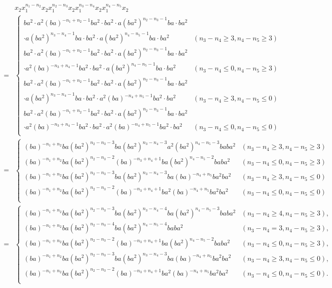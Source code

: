 \documentclass{amsart}
\theoremstyle{plain}
\theoremstyle{definition}
\begin{document}
{\allowdisplaybreaks
\begin{align*}
& x_2x_1^{n_1-n_2}x_2x_1^{n_2-n_3}x_2x_1^{n_3-n_4}x_2x_1^{n_4-n_5}x_2 \\
= & \begin{cases}
ba^2\cdot a^2(ba)^{-n_1+n_2-1}ba^2\cdot ba^2\cdot a(ba^2)^{n_2-n_3-1}ba\cdot ba^2 \\
\cdot a(ba^2)^{n_3-n_4-1}ba\cdot ba^2\cdot a(ba^2)^{n_4-n_5-1}ba\cdot ba^2 & (n_3-n_4\geq 3, n_4-n_5\geq 3) \\
ba^2\cdot a^2(ba)^{-n_1+n_2-1}ba^2\cdot ba^2\cdot a(ba^2)^{n_2-n_3-1}ba\cdot ba^2 \\
\cdot a^2(ba)^{-n_3+n_4-1}ba^2\cdot ba^2\cdot a(ba^2)^{n_4-n_5-1}ba\cdot ba^2 & (n_3-n_4\leq 0, n_4-n_5\geq 3) \\
ba^2\cdot a^2(ba)^{-n_1+n_2-1}ba^2\cdot ba^2\cdot a(ba^2)^{n_2-n_3-1}ba\cdot ba^2 \\
\cdot a(ba^2)^{n_3-n_4-1}ba\cdot ba^2\cdot a^2(ba)^{-n_4+n_5-1}ba^2\cdot ba^2 & (n_3-n_4\geq 3, n_4-n_5\leq 0) \\
ba^2\cdot a^2(ba)^{-n_1+n_2-1}ba^2\cdot ba^2\cdot a(ba^2)^{n_2-n_3-1}ba\cdot ba^2 \\
\cdot a^2(ba)^{-n_3+n_4-1}ba^2\cdot ba^2\cdot a^2(ba)^{-n_4+n_5-1}ba^2\cdot ba^2 & (n_3-n_4\leq 0, n_4-n_5\leq 0) \\
\end{cases} \\
= & \begin{cases}
(ba)^{-n_1+n_2}ba(ba^2)^{n_2-n_3-3}ba(ba^2)^{n_3-n_4-3}a^2(ba^2)^{n_4-n_5-3}baba^2 & (n_3-n_4\geq 3, n_4-n_5\geq 3) \\
(ba)^{-n_1+n_2}ba(ba^2)^{n_2-n_3-2}(ba)^{-n_3+n_4+1}ba(ba^2)^{n_4-n_5-2}baba^2 & (n_3-n_4\leq 0, n_4-n_5\geq 3) \\
(ba)^{-n_1+n_2}ba(ba^2)^{n_2-n_3-3}ba(ba^2)^{n_3-n_4-3}ba(ba)^{-n_4+n_5}ba^2ba^2 & (n_3-n_4\geq 3, n_4-n_5\leq 0) \\
(ba)^{-n_1+n_2}ba(ba^2)^{n_2-n_3-2}(ba)^{-n_3+n_4+1}ba^2(ba)^{-n_4+n_5}ba^2ba^2 & (n_3-n_4\leq 0, n_4-n_5\leq 0) \\
\end{cases} \\
= & \begin{cases}
(ba)^{-n_1+n_2}ba(ba^2)^{n_2-n_3-3}ba(ba^2)^{n_3-n_4-4}ba(ba^2)^{n_4-n_5-3}baba^2 & (n_3-n_4\geq 4, n_4-n_5\geq 3), \\
(ba)^{-n_1+n_2}ba(ba^2)^{n_2-n_3-4}ba(ba^2)^{n_4-n_5-4}baba^2 & (n_3-n_4=3, n_4-n_5\geq 3), \\
(ba)^{-n_1+n_2}ba(ba^2)^{n_2-n_3-2}(ba)^{-n_3+n_4+1}ba(ba^2)^{n_4-n_5-2}baba^2 & (n_3-n_4\leq 0, n_4-n_5\geq 3), \\
(ba)^{-n_1+n_2}ba(ba^2)^{n_2-n_3-3}ba(ba^2)^{n_3-n_4-3}ba(ba)^{-n_4+n_5}ba^2ba^2 & (n_3-n_4\geq 3, n_4-n_5\leq 0), \\
(ba)^{-n_1+n_2}ba(ba^2)^{n_2-n_3-2}(ba)^{-n_3+n_4+1}ba^2(ba)^{-n_4+n_5}ba^2ba^2 & (n_3-n_4\leq 0, n_4-n_5\leq 0). \\
\end{cases}
\end{align*}
}
\end{document}
